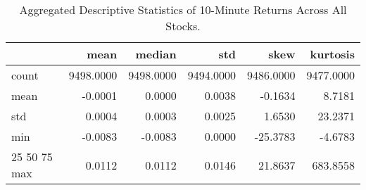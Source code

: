 \begin{table}[ht]
\caption{Aggregated Descriptive Statistics of 10-Minute Returns Across All Stocks.}
\label{tab:agg_stats}
\begin{tabular}{lrrrrr}
\toprule
 & mean & median & std & skew & kurtosis \\
\midrule
count & 9498.0000 & 9498.0000 & 9494.0000 & 9486.0000 & 9477.0000 \\
mean & -0.0001 & 0.0000 & 0.0038 & -0.1634 & 8.7181 \\
std & 0.0004 & 0.0003 & 0.0025 & 1.6530 & 23.2371 \\
min & -0.0083 & -0.0083 & 0.0000 & -25.3783 & -4.6783 \\
25%
50%
75%
max & 0.0112 & 0.0112 & 0.0146 & 21.8637 & 683.8558 \\
\bottomrule
\end{tabular}
\end{table}
